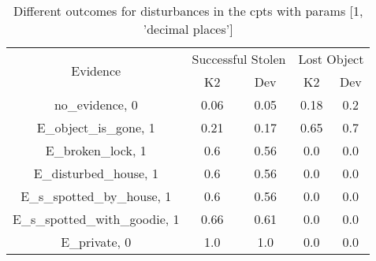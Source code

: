 \begin{table}\begin{tabular}{c|cc|cc}\toprule\multirow{2}{*}{Evidence} & \multicolumn{2}{c}{Successful Stolen} & \multicolumn{2}{c}{Lost Object} \\& {K2} & {Dev} & {K2} & {Dev} \\\midrule
no\_evidence, 0 & \cellcolor{Bittersweet}0.06&\cellcolor{Bittersweet}0.05&\cellcolor{Bittersweet}0.18&\cellcolor{Bittersweet}0.2\\E\_object\_is\_gone, 1 & \cellcolor{Bittersweet}0.21&\cellcolor{Bittersweet}0.17&\cellcolor{Bittersweet}0.65&\cellcolor{Bittersweet}0.7\\E\_broken\_lock, 1 & \cellcolor{Bittersweet}0.6&\cellcolor{Bittersweet}0.56&0.0&0.0\\E\_disturbed\_house, 1 & \cellcolor{Bittersweet}0.6&\cellcolor{Bittersweet}0.56&0.0&0.0\\E\_s\_spotted\_by\_house, 1 & \cellcolor{Bittersweet}0.6&\cellcolor{Bittersweet}0.56&0.0&0.0\\E\_s\_spotted\_with\_goodie, 1 & \cellcolor{Bittersweet}0.66&\cellcolor{Bittersweet}0.61&0.0&0.0\\E\_private, 0 & 1.0&1.0&0.0&0.0\\\bottomrule\end{tabular}\caption{Different outcomes for disturbances in the cpts with params [1, 'decimal places']}\end{table}